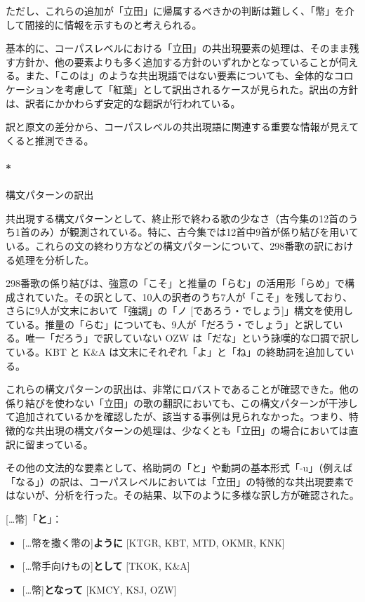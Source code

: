 \documentclass[
  letterpaper,
  DIV=11,
  numbers=noendperiod]{scrartcl}
\let\oldparagraph\paragraph
\renewcommand{\paragraph}[1]{\oldparagraph{#1}\mbox{}}
\providecommand{\tightlist}{%
  \setlength{\itemsep}{0pt}\setlength{\parskip}{0pt}}\usepackage{longtable,booktabs,array}
\begin{document}
ただし、これらの追加が「立田」に帰属するべきかの判断は難しく、「幣」を介して間接的に情報を示すものと考えられる。

基本的に、コーパスレベルにおける「立田」の共出現要素の処理は、そのまま残す方針か、他の要素よりも多く追加する方針のいずれかとなっていることが伺える。また、「このは」のような共出現語ではない要素についても、全体的なコロケーションを考慮して「紅葉」として訳出されるケースが見られた。訳出の方針は、訳者にかかわらず安定的な翻訳が行われている。

訳と原文の差分から、コーパスレベルの共出現語に関連する重要な情報が見えてくると推測できる。

\paragraph*{構文パターンの訳出}\label{ux69cbux6587ux30d1ux30bfux30fcux30f3ux306eux8a33ux51fa}

共出現する構文パターンとして、終止形で終わる歌の少なさ（古今集の12首のうち1首のみ）が観測されている。特に、古今集では12首中9首が係り結びを用いている。これらの文の終わり方などの構文パターンについて、298番歌の訳における処理を分析した。

298番歌の係り結びは、強意の「こそ」と推量の「らむ」の活用形「らめ」で構成されていた。その訳として、10人の訳者のうち7人が「こそ」を残しており、さらに9人が文末において「強調」の「ノ
{[}であろう・でしょう{]}」構文を使用している。推量の「らむ」についても、9人が「だろう・でしょう」と訳している。唯一「だろう」で訳していない
OZW は「だな」という詠嘆的な口調で訳している。KBT と K\&A
は文末にそれぞれ「よ」と「ね」の終助詞を追加している。

これらの構文パターンの訳出は、非常にロバストであることが確認できた。他の係り結びを使わない「立田」の歌の翻訳においても、この構文パターンが干渉して追加されているかを確認したが、該当する事例は見られなかった。つまり、特徴的な共出現の構文パターンの処理は、少なくとも「立田」の場合においては直訳に留まっている。

その他の文法的な要素として、格助詞の「と」や動詞の基本形式「-u」（例えば「なる」）の訳は、コーパスレベルにおいては「立田」の特徴的な共出現要素ではないが、分析を行った。その結果、以下のように多様な訳し方が確認された。

{[}\ldots 幣{]}「\textbf{と}」：

\begin{itemize}
\tightlist
\item
  {[}\ldots 幣を撒く\textbar 幣の{]}\textbf{ように} {[}KTGR, KBT, MTD,
  OKMR, KNK{]}
\item
  {[}\ldots 幣\textbar 手向けもの{]}\textbf{として} {[}TKOK, K\&A{]}
\item
  {[}\ldots 幣{]}\textbf{となって} {[}KMCY, KSJ, OZW{]}
\end{itemize}
\end{document}
